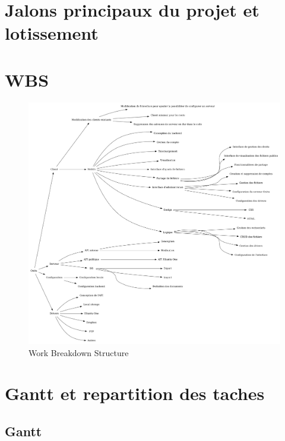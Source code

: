 \section{Jalons principaux du projet et lotissement}


\newpage

\section{WBS}
\begin{figure}[ht]
    \includegraphics[width=\textwidth,height=\textheight,keepaspectratio]{wbs.png}
    \caption{Work Breakdown Structure}
\end{figure}

\section{Gantt et repartition des taches}

\subsection{Gantt}

